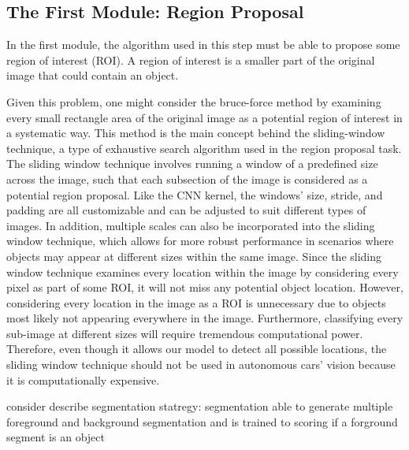 \subsection{The First Module: Region Proposal}
In the first module, the algorithm used in this step must be able to propose some region of interest (ROI). A region of interest is a smaller part of the original image that could contain an object.

Given this problem, one might consider the bruce-force method by examining every small rectangle area of the original image as a potential region of interest in a systematic way. This method is the main concept behind the sliding-window technique, a type of exhaustive search algorithm used in the region proposal task. The sliding window technique involves running a window of a predefined size across the image, such that each subsection of the image is considered as a potential region proposal. Like the CNN kernel, the windows' size, stride, and padding are all customizable and can be adjusted to suit different types of images. In addition, multiple scales can also be incorporated into the sliding window technique, which allows for more robust performance in scenarios where objects may appear at different sizes within the same image. Since the sliding window technique examines every location within the image by considering every pixel as part of some ROI, it will not miss any potential object location. However, considering every location in the image as a ROI is unnecessary due to objects most likely not appearing everywhere in the image. Furthermore, classifying every sub-image at different sizes will require tremendous computational power. Therefore, even though it allows our model to detect all possible locations, the sliding window technique should not be used in autonomous cars' vision because it is computationally expensive.

{\color{red} consider describe segmentation statregy: segmentation able to generate multiple foreground and background segmentation and is trained to scoring if a forground segment is an object}

